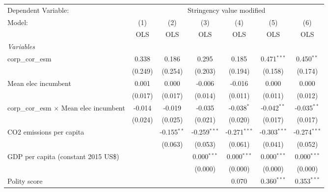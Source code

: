 
\begingroup
\centering
\begin{tabular}{lcccccc}
   \toprule
   Dependent Variable: & \multicolumn{6}{c}{Stringency value modified}\\
   Model:                                         & (1)     & (2)           & (3)            & (4)            & (5)            & (6)\\  
                                                  &  OLS    & OLS           & OLS            & OLS            & OLS            & OLS\\  
   \midrule
   \emph{Variables}\\
   corp\_cor\_esm                                 & 0.338   & 0.186         & 0.295          & 0.185          & 0.471$^{***}$  & 0.450$^{**}$\\   
                                                  & (0.249) & (0.254)       & (0.203)        & (0.194)        & (0.158)        & (0.174)\\   
   Mean elec incumbent                            & 0.001   & 0.000         & -0.006         & -0.016         & 0.000          & 0.000\\   
                                                  & (0.017) & (0.017)       & (0.014)        & (0.011)        & (0.011)        & (0.012)\\   
   corp\_cor\_esm $\times$ Mean elec incumbent    & -0.014  & -0.019        & -0.035         & -0.038$^{*}$   & -0.042$^{**}$  & -0.035$^{**}$\\   
                                                  & (0.024) & (0.025)       & (0.021)        & (0.020)        & (0.017)        & (0.017)\\   
   CO2 emissions per capita                       &         & -0.155$^{**}$ & -0.259$^{***}$ & -0.271$^{***}$ & -0.303$^{***}$ & -0.274$^{***}$\\   
                                                  &         & (0.063)       & (0.053)        & (0.061)        & (0.041)        & (0.052)\\   
   GDP per capita (constant 2015 US\$)            &         &               & 0.000$^{***}$  & 0.000$^{***}$  & 0.000$^{***}$  & 0.000$^{***}$\\   
                                                  &         &               & (0.000)        & (0.000)        & (0.000)        & (0.000)\\   
   Polity score                                   &         &               &                & 0.070          & 0.360$^{***}$  & 0.353$^{***}$\\   

\end{tabular}
